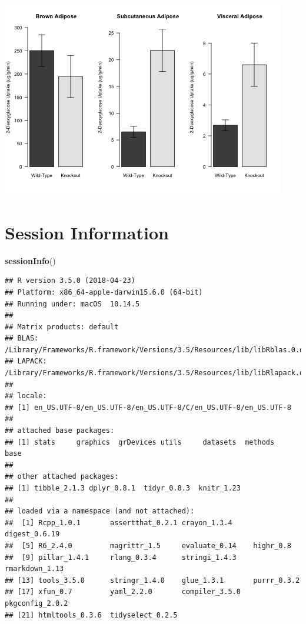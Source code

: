 \documentclass[]{article}
\newenvironment{Shaded}{\begin{snugshade}}{\end{snugshade}}
\newcommand{\KeywordTok}[1]{\textcolor[rgb]{0.13,0.29,0.53}{\textbf{#1}}}
\newcommand{\NormalTok}[1]{#1}
\begin{document}
\includegraphics{figures/adipose-1.png}

\section{Session Information}\label{session-information}

\begin{Shaded}
\begin{Highlighting}[]
\KeywordTok{sessionInfo}\NormalTok{()}
\end{Highlighting}
\end{Shaded}

\begin{verbatim}
## R version 3.5.0 (2018-04-23)
## Platform: x86_64-apple-darwin15.6.0 (64-bit)
## Running under: macOS  10.14.5
## 
## Matrix products: default
## BLAS: /Library/Frameworks/R.framework/Versions/3.5/Resources/lib/libRblas.0.dylib
## LAPACK: /Library/Frameworks/R.framework/Versions/3.5/Resources/lib/libRlapack.dylib
## 
## locale:
## [1] en_US.UTF-8/en_US.UTF-8/en_US.UTF-8/C/en_US.UTF-8/en_US.UTF-8
## 
## attached base packages:
## [1] stats     graphics  grDevices utils     datasets  methods   base     
## 
## other attached packages:
## [1] tibble_2.1.3 dplyr_0.8.1  tidyr_0.8.3  knitr_1.23  
## 
## loaded via a namespace (and not attached):
##  [1] Rcpp_1.0.1       assertthat_0.2.1 crayon_1.3.4     digest_0.6.19   
##  [5] R6_2.4.0         magrittr_1.5     evaluate_0.14    highr_0.8       
##  [9] pillar_1.4.1     rlang_0.3.4      stringi_1.4.3    rmarkdown_1.13  
## [13] tools_3.5.0      stringr_1.4.0    glue_1.3.1       purrr_0.3.2     
## [17] xfun_0.7         yaml_2.2.0       compiler_3.5.0   pkgconfig_2.0.2 
## [21] htmltools_0.3.6  tidyselect_0.2.5
\end{verbatim}
\end{document}
